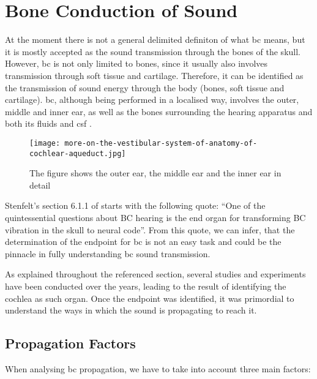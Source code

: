 \section{Bone Conduction of Sound}\label{sec:bonepaths}
At the moment there is not a general delimited definiton of what \gls{bc} means, but it is mostly accepted as the sound transmission through the bones of the skull. However, \gls{bc} is not only limited to bones, since it usually also involves transmission through soft tissue and cartilage. Therefore, it can be identified as the transmission of sound energy through the body (bones, soft tissue and cartilage). 
\gls{bc}, although being performed in a localised way, involves the outer, middle and inner ear, as well as the bones surrounding the hearing apparatus and both its fluids and \gls{csf} \citep{puria_2013}.
 \begin{figure}[H]
	\centering
		\texttt{[image: more-on-the-vestibular-system-of-anatomy-of-cochlear-aqueduct.jpg]}
		\caption{The figure shows the outer ear, the middle ear and the inner ear in detail}
		\label{fig:hearing_system_detail}
\end{figure}
Stenfelt's section 6.1.1 of \citep{puria_2013} starts with the following quote: \enquote{One of the quintessential questions about BC hearing is the end organ for
transforming BC vibration in the skull to neural code}. From this quote, we can infer, that the determination of the endpoint for \gls{bc} is not an easy task and could be the pinnacle in fully understanding \gls{bc} sound transmission.

As explained throughout the referenced section, several studies and experiments have been conducted over the years, leading to the result of identifying the cochlea as such organ. Once the endpoint was identified, it was primordial to understand the ways in which the sound is propagating to reach it.
\subsection{Propagation Factors}

When analysing \gls{bc} propagation, we have to take into account three main factors:

